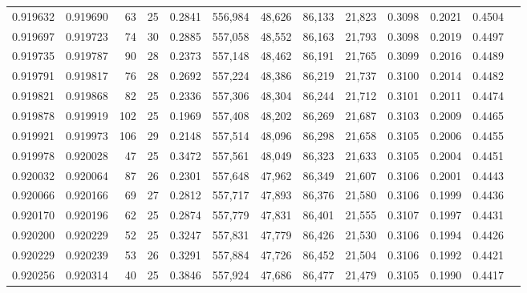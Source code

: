 \begin{tabular}{rrrrrrrrrrrrr}
0.919632 & 0.919690 &    63 &  25 &                                     0.2841 & 556,984 &  48,626 &  86,133 &  21,823 & 0.3098 & 0.2021 & 0.4504 \\
0.919697 & 0.919723 &    74 &  30 &                                     0.2885 & 557,058 &  48,552 &  86,163 &  21,793 & 0.3098 & 0.2019 & 0.4497 \\
0.919735 & 0.919787 &    90 &  28 &                                     0.2373 & 557,148 &  48,462 &  86,191 &  21,765 & 0.3099 & 0.2016 & 0.4489 \\
0.919791 & 0.919817 &    76 &  28 &                                     0.2692 & 557,224 &  48,386 &  86,219 &  21,737 & 0.3100 & 0.2014 & 0.4482 \\
0.919821 & 0.919868 &    82 &  25 &                                     0.2336 & 557,306 &  48,304 &  86,244 &  21,712 & 0.3101 & 0.2011 & 0.4474 \\
0.919878 & 0.919919 &   102 &  25 &                                     0.1969 & 557,408 &  48,202 &  86,269 &  21,687 & 0.3103 & 0.2009 & 0.4465 \\
0.919921 & 0.919973 &   106 &  29 &                                     0.2148 & 557,514 &  48,096 &  86,298 &  21,658 & 0.3105 & 0.2006 & 0.4455 \\
0.919978 & 0.920028 &    47 &  25 &                                     0.3472 & 557,561 &  48,049 &  86,323 &  21,633 & 0.3105 & 0.2004 & 0.4451 \\
0.920032 & 0.920064 &    87 &  26 &                                     0.2301 & 557,648 &  47,962 &  86,349 &  21,607 & 0.3106 & 0.2001 & 0.4443 \\
0.920066 & 0.920166 &    69 &  27 &                                     0.2812 & 557,717 &  47,893 &  86,376 &  21,580 & 0.3106 & 0.1999 & 0.4436 \\
0.920170 & 0.920196 &    62 &  25 &                                     0.2874 & 557,779 &  47,831 &  86,401 &  21,555 & 0.3107 & 0.1997 & 0.4431 \\
0.920200 & 0.920229 &    52 &  25 &                                     0.3247 & 557,831 &  47,779 &  86,426 &  21,530 & 0.3106 & 0.1994 & 0.4426 \\
0.920229 & 0.920239 &    53 &  26 &                                     0.3291 & 557,884 &  47,726 &  86,452 &  21,504 & 0.3106 & 0.1992 & 0.4421 \\
0.920256 & 0.920314 &    40 &  25 &                                     0.3846 & 557,924 &  47,686 &  86,477 &  21,479 & 0.3105 & 0.1990 & 0.4417 \\

\end{tabular}
